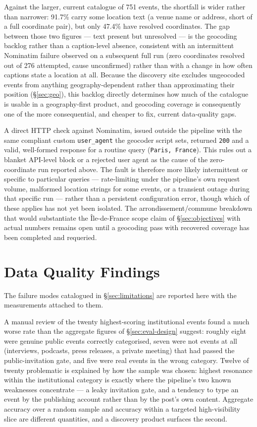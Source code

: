 \documentclass[12pt, a4paper]{report}
\begin{document}
Against the larger, current catalogue of 751 events, the shortfall is
wider rather than narrower: 91.7\% carry some location text (a venue name
or address, short of a full coordinate pair), but only 47.4\% have
resolved coordinates. The gap between those two figures — text present
but unresolved — is the geocoding backlog rather than a caption-level
absence, consistent with an intermittent Nominatim failure observed on a
subsequent full run (zero coordinates resolved out of 276 attempted,
cause unconfirmed) rather than with a change in how often captions state
a location at all. Because the discovery site excludes ungeocoded events
from anything geography-dependent rather than approximating their
position (\S\ref{sec:geo}), this backlog directly determines how much of
the catalogue is usable in a geography-first product, and geocoding
coverage is consequently one of the more consequential, and cheaper to
fix, current data-quality gaps.

A direct HTTP check against Nominatim, issued outside the pipeline with
the same compliant custom \texttt{user\_agent} the geocoder script sets,
returned \texttt{200} and a valid, well-formed response for a routine
query (\texttt{Paris, France}). This rules out a blanket API-level block
or a rejected user agent as the cause of the zero-coordinate run reported
above. The fault is therefore more likely intermittent or specific to
particular queries — rate-limiting under the pipeline's own request
volume, malformed location strings for some events, or a transient outage
during that specific run — rather than a persistent configuration error,
though which of these applies has not yet been isolated. The
arrondissement/commune breakdown that would substantiate the
Île-de-France scope claim of \S\ref{sec:objectives} with actual numbers
remains open until a geocoding pass with recovered coverage has been
completed and requeried.

\section{Data Quality Findings}
\label{sec:data-quality}
The failure modes catalogued in \S\ref{sec:limitations} are reported
here with the measurements attached to them.

A manual review of the twenty highest-scoring institutional events found
a much worse rate than the aggregate figures of \S\ref{sec:eval-design}
suggest: roughly eight were genuine public events correctly categorised,
seven were not events at all (interviews, podcasts, press releases, a
private meeting) that had passed the public-invitation gate, and five
were real events in the wrong category. Twelve of twenty problematic is
explained by how the sample was chosen: highest resonance within the
institutional category is exactly where the pipeline's two known
weaknesses concentrate — a leaky invitation gate, and a tendency to type
an event by the publishing account rather than by the post's own
content. Aggregate accuracy over a random sample and accuracy within a
targeted high-visibility slice are different quantities, and a discovery
product surfaces the second.
\end{document}
